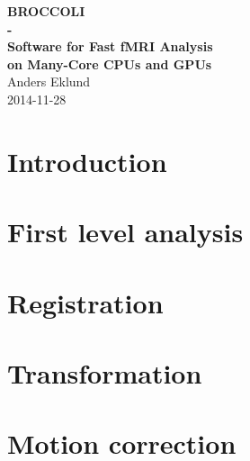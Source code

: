 \documentclass[11pt,a4paper,swedish]{book}
\makeatletter
\def\cleardoublepage{\clearpage\if@twoside \ifodd\c@page\else
\hbox{}
\thispagestyle{empty}     
\newpage 
\if@twocolumn\hbox{}\newpage\fi\fi\fi}
\makeatother
\begin{document}



\thispagestyle{empty}
\makeatletter
\begin{center}
  {\huge \textbf{BROCCOLI \\ - \\ Software for Fast fMRI Analysis \\ on Many-Core CPUs and GPUs}}\\[1 cm]
  {\Large Anders Eklund}\\[1.5 cm]
  {\Large 2014-11-28}\\[1.5 cm]
\end{center}


\renewcommand{\contentsname}{Table of Contents}
\tableofcontents



%


\chapter{Introduction}
\label{sec:intro}


\cleardoublepage
\newpage
\chapter{First level analysis}
\label{sec:firstlevel}


\cleardoublepage
\newpage
\chapter{Registration}
\label{sec:registration}


\cleardoublepage
\newpage
\chapter{Transformation}
\label{sec:transformation}


\cleardoublepage
\newpage
\chapter{Motion correction}
\label{sec:motion}

\end{document}

